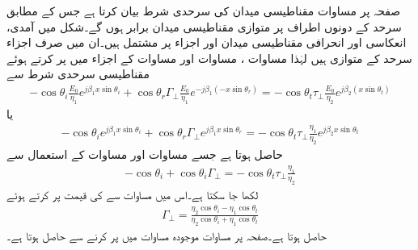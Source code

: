 صفحہ  پر  مساوات  مقناطیسی میدان کی سرحدی شرط بیان کرتا ہے جس کے مطابق سرحد کے دونوں اطراف پر متوازی مقناطیسی میدان برابر ہوں گے۔شکل  میں آمدی، انعکاسی اور انحرافی مقناطیسی میدان  اور  اجزاء  پر مشتمل ہیں۔ان میں صرف  اجزاء سرحد کے متوازی ہیں لہٰذا مساوات ، مساوات  اور مساوات  کے  اجزاء میں  پر کرتے ہوئے مقناطیسی سرحدی شرط سے  
\begin{align*}
 -\cos \theta_i \frac{E_0}{\eta_1} e^{j\beta_1 x\sin \theta_i }+\cos \theta_r \Gamma_{\perp} \frac{ E_0}{\eta_1} e^{-j \beta_1 (-x \sin \theta_r)}=-\cos \theta_t  \tau_{\perp} \frac{E_0}{\eta_2} e^{j \beta_2 (x \sin \theta_t)}
\end{align*}
یا
\begin{align*}
 -\cos \theta_i  e^{j\beta_1 x\sin \theta_i }+\cos \theta_r \Gamma_{\perp}  e^{j \beta_1 x \sin \theta_r}=-\cos \theta_t  \tau_{\perp} \frac{\eta_1}{\eta_2} e^{j \beta_2  x \sin \theta_t}
\end{align*}
حاصل ہوتا ہے جسے مساوات  اور مساوات  کے استعمال سے
\begin{align*}
 -\cos \theta_i +\cos \theta_i \Gamma_{\perp} =-\cos \theta_t  \tau_{\perp} \frac{\eta_1}{\eta_2}
\end{align*}
لکھا جا سکتا ہے۔اس میں مساوات  سے  کی قیمت پر کرتے ہوئے
\begin{align}\label{مساوات_ترچھی_شرح_انعکاس_عمودی_الف}
\Gamma_{\perp}=\frac{\eta_2 \cos \theta_i -\eta_1 \cos \theta_t}{\eta_2 \cos \theta_i +\eta_1 \cos \theta_t}
\end{align}
حاصل ہوتا ہے۔صفحہ  پر مساوات  موجودہ مساوات میں  پر کرنے سے حاصل ہوتا ہے۔

